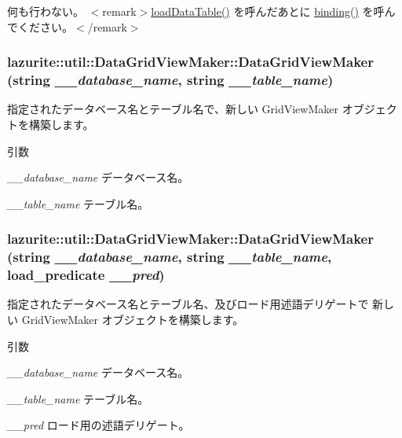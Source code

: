 何も行わない。 $<$remark$>$\hyperlink{classlazurite_1_1util_1_1_data_grid_view_maker_a0ba85be729407fe9b20928061a4d4ce9}{loadDataTable()} を呼んだあとに \hyperlink{classlazurite_1_1util_1_1_data_grid_view_maker_aa07340c1021a0749c64ffa0cca0bcd7d}{binding()} を呼んでください。$<$/remark$>$ \hypertarget{classlazurite_1_1util_1_1_data_grid_view_maker_acbe3ddd315c9f36fc069106764af7d8f}{
\subsubsection[{DataGridViewMaker}]{\setlength{\rightskip}{0pt plus 5cm}lazurite::util::DataGridViewMaker::DataGridViewMaker (string {\em \_\-\_\-database\_\-name}, \/  string {\em \_\-\_\-table\_\-name})}}
\label{classlazurite_1_1util_1_1_data_grid_view_maker_acbe3ddd315c9f36fc069106764af7d8f}


指定されたデータベース名とテーブル名で、新しい GridViewMaker オブジェクトを構築します。 
\begin{DoxyParams}{引数}
\item[{\em \_\-\_\-database\_\-name}]データベース名。\item[{\em \_\-\_\-table\_\-name}]テーブル名。\end{DoxyParams}
\hypertarget{classlazurite_1_1util_1_1_data_grid_view_maker_a95ba94cf41919947c77711c03ddf972c}{
\subsubsection[{DataGridViewMaker}]{\setlength{\rightskip}{0pt plus 5cm}lazurite::util::DataGridViewMaker::DataGridViewMaker (string {\em \_\-\_\-database\_\-name}, \/  string {\em \_\-\_\-table\_\-name}, \/  load\_\-predicate {\em \_\-\_\-pred})}}
\label{classlazurite_1_1util_1_1_data_grid_view_maker_a95ba94cf41919947c77711c03ddf972c}


指定されたデータベース名とテーブル名、及びロード用述語デリゲートで 新しい GridViewMaker オブジェクトを構築します。 
\begin{DoxyParams}{引数}
\item[{\em \_\-\_\-database\_\-name}]データベース名。\item[{\em \_\-\_\-table\_\-name}]テーブル名。\item[{\em \_\-\_\-pred}]ロード用の述語デリゲート。\end{DoxyParams}


